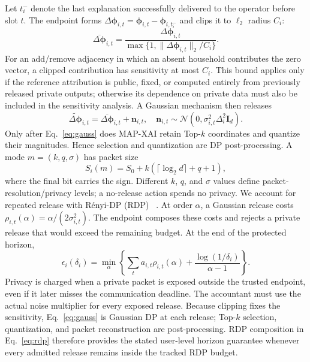 \documentclass[conference]{IEEEtran}
\newcommand{\mapxai}{MAP-XAI}
\newcommand{\medmath}[1]{#1}
\begin{document}
Let $t_i^-$ denote the last explanation successfully delivered to the operator before slot $t$. The endpoint forms $\Delta\bm\phi_{i,t}=\bm\phi_{i,t}-\bm\phi_{i,t_i^-}$ and clips it to $\ell_2$ radius $C_i$:
\begin{equation}
\medmath{\overline{\Delta\bm\phi}_{i,t}=
\frac{\Delta\bm\phi_{i,t}}
{\max\{1,\|\Delta\bm\phi_{i,t}\|_2/C_i\}}}.
\label{eq:clip}
\end{equation}
For an add/remove adjacency in which an absent household contributes the zero vector, a clipped contribution has sensitivity at most $C_i$. This bound applies only if the reference attribution is public, fixed, or computed entirely from previously released private outputs; otherwise its dependence on private data must also be included in the sensitivity analysis. A Gaussian mechanism then releases
\begin{equation}
\medmath{\widetilde{\Delta\bm\phi}_{i,t}=
\overline{\Delta\bm\phi}_{i,t}+\bm n_{i,t},\quad
\bm n_{i,t}\sim\mathcal N(0,\sigma_{i,t}^2\Delta_i^2\bm I_d).}
\label{eq:gauss}
\end{equation}
Only after Eq.~\eqref{eq:gauss} does \mapxai{} retain Top-$k$ coordinates and quantize their magnitudes. Hence selection and quantization are DP post-processing. A mode $m=(k,q,\sigma)$ has packet size
\begin{equation}
\medmath{S_i(m)=S_0+k(\lceil\log_2 d\rceil+q+1),}
\label{eq:size}
\end{equation}
where the final bit carries the sign. Different $k$, $q$, and $\sigma$ values define packet-resolution/privacy levels; a no-release action spends no privacy.
We account for repeated release with R\'enyi-DP (RDP)
~\cite{mironov2017rdp}. At order $\alpha$, a Gaussian release costs
$\rho_{i,t}(\alpha)=\alpha/(2\sigma_{i,t}^2)$. The endpoint composes
these costs and rejects a private release that would exceed the remaining
budget. At the end of the protected horizon,
\begin{equation}
\medmath{\epsilon_i(\delta_i)=\min_{\alpha}
\left\{\sum_t a_{i,t}\rho_{i,t}(\alpha)+
\frac{\log(1/\delta_i)}{\alpha-1}\right\}.}
\label{eq:rdp}
\end{equation}
Privacy is charged when a private packet is exposed outside the trusted
endpoint, even if it later misses the communication deadline. The
accountant must use the actual noise multiplier for every exposed release. Because
clipping fixes the sensitivity, Eq.~\eqref{eq:gauss} is Gaussian DP at
each release; Top-$k$ selection, quantization, and packet reconstruction
are post-processing. RDP composition in Eq.~\eqref{eq:rdp} therefore
provides the stated user-level horizon guarantee whenever every admitted
release remains inside the tracked RDP budget.
\end{document}
